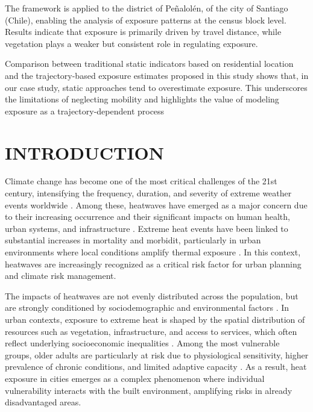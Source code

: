 \documentclass{wscpaperproc}
\theoremstyle{wsc}
\begin{document}
The framework is applied to the district of Peñalolén, of the city of Santiago (Chile), enabling the analysis of exposure patterns at the census block level. Results indicate that exposure is primarily driven by travel distance, while vegetation plays a weaker but consistent role in regulating exposure.

Comparison between traditional static indicators based on residential location and the trajectory-based exposure estimates proposed in this study shows that, in our case study,  static approaches tend to overestimate exposure. This underscores the limitations of neglecting mobility and highlights the value of modeling exposure as a trajectory-dependent process

\section{INTRODUCTION}
\label{sec:intro}

Climate change has become one of the most critical challenges of the 21st century, intensifying the frequency, duration, and severity of extreme weather events worldwide \cite{moore2024precipitation}. Among these, heatwaves have emerged as a major concern due to their increasing occurrence and their significant impacts on human health, urban systems, and infrastructure \cite{luber2008heat}. 
Extreme heat events have been linked to substantial increases in mortality and morbidit, particularly in urban environments where local conditions amplify thermal exposure \cite{barriopedro2023heatwaves}. In this context, heatwaves are increasingly recognized as a critical risk factor for urban planning and climate risk management.

The impacts of heatwaves are not evenly distributed across the population, but are strongly conditioned by sociodemographic and environmental factors \cite{wilhelmi2010framework}. In urban contexts, exposure to extreme heat is shaped by the spatial distribution of resources such as vegetation, infrastructure, and access to services, which often reflect underlying socioeconomic inequalities \cite{schwaab2021urban}. Among the most vulnerable groups, older adults are particularly at risk due to physiological sensitivity, higher prevalence of chronic conditions, and limited adaptive capacity \cite{arsad2022heatwaves}. As a result, heat exposure in cities emerges as a complex phenomenon where individual vulnerability interacts with the built environment, amplifying risks in already disadvantaged areas.
\end{document}

